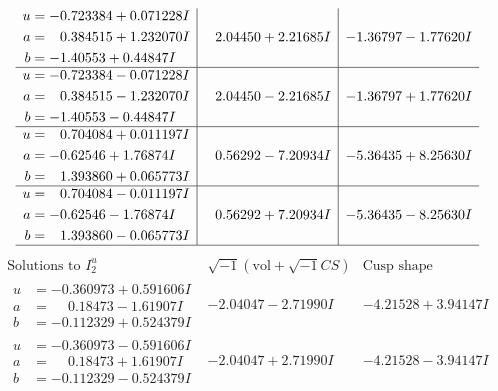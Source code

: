 \documentclass[1p]{elsarticle_modified}
\theoremstyle{definition}
\newcommand{\I}{\sqrt{-1}}
\begin{document}
$$\begin{array}{c|c|c}
\begin{aligned}
u &= -0.723384 + 0.071228 I \\
a &= \phantom{-}0.384515 + 1.232070 I \\
b &= -1.40553 + 0.44847 I\end{aligned}
 & \phantom{-}2.04450 + 2.21685 I & -1.36797 - 1.77620 I \\ \hline\begin{aligned}
u &= -0.723384 - 0.071228 I \\
a &= \phantom{-}0.384515 - 1.232070 I \\
b &= -1.40553 - 0.44847 I\end{aligned}
 & \phantom{-}2.04450 - 2.21685 I & -1.36797 + 1.77620 I \\ \hline\begin{aligned}
u &= \phantom{-}0.704084 + 0.011197 I \\
a &= -0.62546 + 1.76874 I \\
b &= \phantom{-}1.393860 + 0.065773 I\end{aligned}
 & \phantom{-}0.56292 - 7.20934 I & -5.36435 + 8.25630 I \\ \hline\begin{aligned}
u &= \phantom{-}0.704084 - 0.011197 I \\
a &= -0.62546 - 1.76874 I \\
b &= \phantom{-}1.393860 - 0.065773 I\end{aligned}
 & \phantom{-}0.56292 + 7.20934 I & -5.36435 - 8.25630 I\\
 \hline 
 \end{array}$$\newpage$$\begin{array}{c|c|c}  
\text{Solutions to }I^u_{2}& \I (\text{vol} + \sqrt{-1}CS) & \text{Cusp shape}\\
 \hline 
\begin{aligned}
u &= -0.360973 + 0.591606 I \\
a &= \phantom{-}0.18473 - 1.61907 I \\
b &= -0.112329 + 0.524379 I\end{aligned}
 & -2.04047 - 2.71990 I & -4.21528 + 3.94147 I \\ \hline\begin{aligned}
u &= -0.360973 - 0.591606 I \\
a &= \phantom{-}0.18473 + 1.61907 I \\
b &= -0.112329 - 0.524379 I\end{aligned}
 & -2.04047 + 2.71990 I & -4.21528 - 3.94147 I \\ \hline\begin{aligned}

\end{aligned}
\end{array}$$
\end{document}
